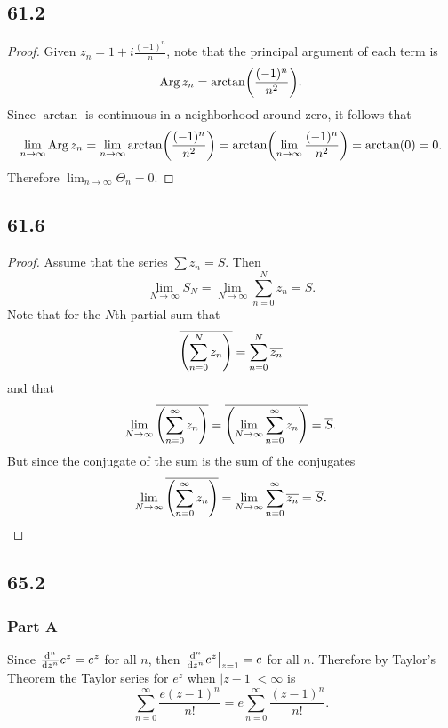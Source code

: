 \documentclass[12pt]{extarticle}
\begin{document}

\subsection*{61.2}
\begin{proof}
    Given $z_n = 1 + i \frac{(-1)^n}{n}$, note that the principal argument of each term is
    \[
        \operatorname{Arg} z_n = \arctan(\frac{(-1)^n}{n^2})
    .\]
    Since $\arctan$ is continuous in a neighborhood around zero, it follows that
    \[
        \lim_{n\to \infty} \operatorname{Arg} z_n = \lim_{n \to \infty} \arctan(\frac{(-1)^n}{n^2}) = \arctan(\lim_{n \to \infty} \frac{(-1)^n}{n^2}) = \arctan(0) = 0
    .\]
    Therefore $\lim_{n \to \infty} \Theta_n = 0$.
\end{proof}

\subsection*{61.6}
\begin{proof}
    Assume that the series $\sum z_n = S$. Then
    \[
        \lim_{N \to \infty} S_N = \lim_{N \to \infty} \sum_{n = 0}^N z_n = S
    .\]
    Note that for the $N$th partial sum that
    \[
        \overline{\qty(\sum_{n = 0}^N z_n)} = \sum_{n = 0}^N \overline{z_n}
    \]
    and that
    \[
        \lim_{N \to \infty}\overline{\qty(\sum_{n = 0}^\infty z_n)} = \overline{\qty(\lim_{N \to \infty} \sum_{n = 0}^\infty z_n)} = \overline{S}
    .\]
    But since the conjugate of the sum is the sum of the conjugates
    \[
        \lim_{N \to \infty} \overline{\qty(\sum_{n = 0}^\infty z_n)} = \lim_{N \to \infty} \sum_{n=0}^\infty \overline{z_n} = \overline{S}
    .\]
\end{proof}

\newpage

\subsection*{65.2}
\begin{problem} \subsubsection*{Part A}
    Since $\dv[n]{z} e^z = e^{z}$ for all $n$, then $\eval{\dv[n]{z} e^z}_{z=1} = e$ for all $n$. Therefore by Taylor's Theorem the Taylor series for $e^z$ when $|z-1| < \infty$ is
    \[
        \sum_{n = 0}^\infty \frac{e (z-1)^n}{n!} = e \sum_{n = 0}^\infty \frac{(z-1)^n}{n!}
    .\]
\end{problem}
\end{document}
